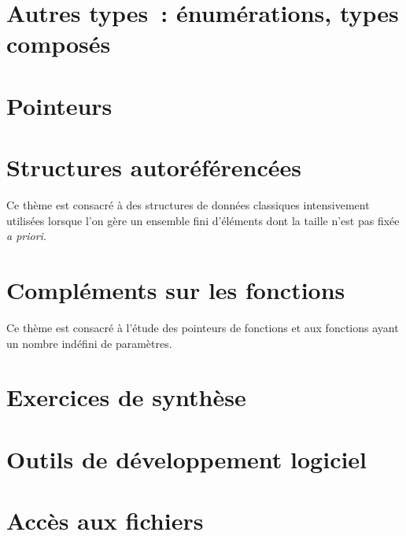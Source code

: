 \documentclass[12pt,draft]{book}
\begin{document}
\chapter{Autres types~: \'enum\'erations, types compos\'es}
\label{cha:TypesComposes}

\chapter{Pointeurs}
\label{cha:Pointeurs}

%
\chapter{Structures autor\'ef\'erenc\'ees}
\label{cha:StructuresAutoreferencees}
Ce th\`eme est consacr\'e  \`a des structures de donn\'ees classiques
intensivement utilis\'ees lorsque  l'on    g\`ere  un  ensemble   fini
d'\'el\'ements  dont la  taille n'est  pas  fix\'ee  \emph{a  priori}. 

\chapter{Compl\'ements sur les fonctions}
\label{cha:ComplementsFonctions}
Ce th\`eme est consacr\'e \`a l'\'etude des pointeurs de fonctions et
aux fonctions ayant un nombre ind\'efini de param\`etres.

\appendix
\chapter{Exercices de synth\`ese}
\label{cha:ExercicesDeSynthese}

\chapter{Outils de d\'eveloppement logiciel}
\label{cha:ODLU}

\chapter{Acc\`es aux fichiers}
\label{cha:AccesAuxFichiers}

\ifhtml
\end{document}
